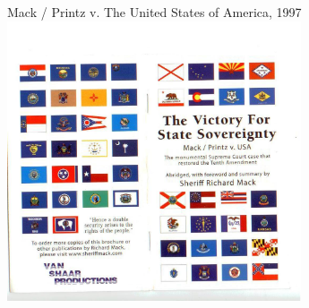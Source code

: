 
%
%

\begin{frame}{Mack / Printz v. The United States of America, 1997}
    \centering
    \includegraphics[width=0.65\textwidth]{img/printz-mack.jpg} \\
\end{frame}

